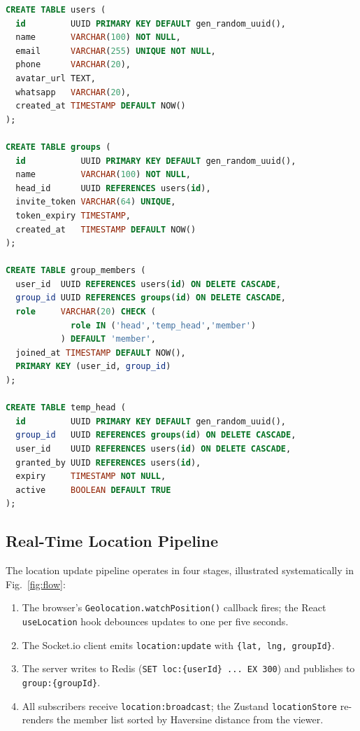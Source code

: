 \documentclass[conference]{IEEEtran}
\begin{document}
\begin{lstlisting}[language=SQL, caption={Core PostgreSQL schema (condensed).}, label={lst:schema}]
CREATE TABLE users (
  id         UUID PRIMARY KEY DEFAULT gen_random_uuid(),
  name       VARCHAR(100) NOT NULL,
  email      VARCHAR(255) UNIQUE NOT NULL,
  phone      VARCHAR(20),
  avatar_url TEXT,
  whatsapp   VARCHAR(20),
  created_at TIMESTAMP DEFAULT NOW()
);

CREATE TABLE groups (
  id           UUID PRIMARY KEY DEFAULT gen_random_uuid(),
  name         VARCHAR(100) NOT NULL,
  head_id      UUID REFERENCES users(id),
  invite_token VARCHAR(64) UNIQUE,
  token_expiry TIMESTAMP,
  created_at   TIMESTAMP DEFAULT NOW()
);

CREATE TABLE group_members (
  user_id  UUID REFERENCES users(id) ON DELETE CASCADE,
  group_id UUID REFERENCES groups(id) ON DELETE CASCADE,
  role     VARCHAR(20) CHECK (
             role IN ('head','temp_head','member')
           ) DEFAULT 'member',
  joined_at TIMESTAMP DEFAULT NOW(),
  PRIMARY KEY (user_id, group_id)
);

CREATE TABLE temp_head (
  id         UUID PRIMARY KEY DEFAULT gen_random_uuid(),
  group_id   UUID REFERENCES groups(id) ON DELETE CASCADE,
  user_id    UUID REFERENCES users(id) ON DELETE CASCADE,
  granted_by UUID REFERENCES users(id),
  expiry     TIMESTAMP NOT NULL,
  active     BOOLEAN DEFAULT TRUE
);
\end{lstlisting}

\subsection{Real-Time Location Pipeline}

The location update pipeline operates in four stages, illustrated systematically in Fig.~\ref{fig:flow}:
\begin{enumerate}
  \item The browser's \texttt{Geolocation.watchPosition()} callback
        fires; the React \texttt{useLocation} hook debounces updates
        to one per five seconds.
  \item The Socket.io client emits \texttt{location:update}
        with \texttt{\{lat, lng, groupId\}}.
  \item The server writes to Redis (\texttt{SET loc:\{userId\} ...\
        EX 300}) and publishes to \texttt{group:\{groupId\}}.
  \item All subscribers receive \texttt{location:broadcast}; the
        Zustand \texttt{locationStore} re-renders the member list
        sorted by Haversine distance from the viewer.
\end{enumerate}
\end{document}
